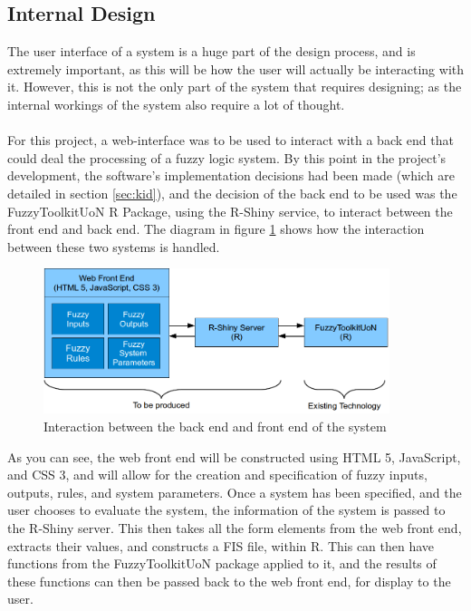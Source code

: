 \subsection{Internal Design}
The user interface of a system is a huge part of the design process, and is extremely important, as this will be how the user will actually be interacting with it. However, this is not the only part of the system that requires designing; as the internal workings of the system also require a lot of thought. \ \\
\ \\
For this project, a web-interface was to be used to interact with a back end that could deal the processing of a fuzzy logic system. By this point in the project's development, the software's implementation decisions had been made (which are detailed in section \ref{sec:kid}), and the decision of the back end to be used was the FuzzyToolkitUoN R Package, using the R-Shiny service, to interact between the front end and back end. The diagram in figure \ref{fig:architectureDiagram} shows how the interaction between these two systems is handled.

\begin{figure}[ht!]
\begin{center}
\includegraphics[width=0.9\textwidth]{images/architecture}
\end{center}
\caption{Interaction between the back end and front end of the system}
\label{fig:architectureDiagram}
\end{figure}

\noindent
As you can see, the web front end will be constructed using HTML 5, JavaScript, and CSS 3, and will allow for the creation and specification of fuzzy inputs, outputs, rules, and system parameters. Once a system has been specified, and the user chooses to evaluate the system, the information of the system is passed to the R-Shiny server. This then takes all the form elements from the web front end, extracts their values, and constructs a FIS file, within R. This can then have functions from the FuzzyToolkitUoN package applied to it, and the results of these functions can then be passed back to the web front end, for display to the user.